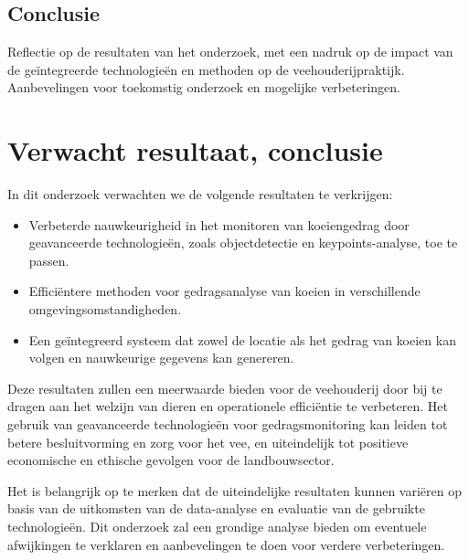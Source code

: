 \subsection{Conclusie}
Reflectie op de resultaten van het onderzoek, met een nadruk op de impact van de geïntegreerde technologieën en methoden op de veehouderijpraktijk. Aanbevelingen voor toekomstig onderzoek en mogelijke verbeteringen.
\section{Verwacht resultaat, conclusie}%
\label{sec:verwachte_resultaten}

In dit onderzoek verwachten we de volgende resultaten te verkrijgen:
\begin{itemize}
  \item Verbeterde nauwkeurigheid in het monitoren van koeiengedrag door geavanceerde technologieën, zoals objectdetectie en keypoints-analyse, toe te passen.
  \item Efficiëntere methoden voor gedragsanalyse van koeien in verschillende omgevingsomstandigheden.
  \item Een geïntegreerd systeem dat zowel de locatie als het gedrag van koeien kan volgen en nauwkeurige gegevens kan genereren.
\end{itemize}
Deze resultaten zullen een meerwaarde bieden voor de veehouderij door bij te dragen aan het welzijn van dieren en operationele efficiëntie te verbeteren. Het gebruik van geavanceerde technologieën voor gedragsmonitoring kan leiden tot betere besluitvorming en zorg voor het vee, en uiteindelijk tot positieve economische en ethische gevolgen voor de landbouwsector.

Het is belangrijk op te merken dat de uiteindelijke resultaten kunnen variëren op basis van de uitkomsten van de data-analyse en evaluatie van de gebruikte technologieën. Dit onderzoek zal een grondige analyse bieden om eventuele afwijkingen te verklaren en aanbevelingen te doen voor verdere verbeteringen.

